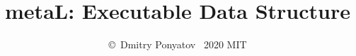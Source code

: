 

\author{\copyright\ Dmitry Ponyatov \ 2020 MIT}
\title{metaL: Executable Data Structure}





\renewcommand{\contentsname}{}
\tableofcontents \secdown
\listoflistings









